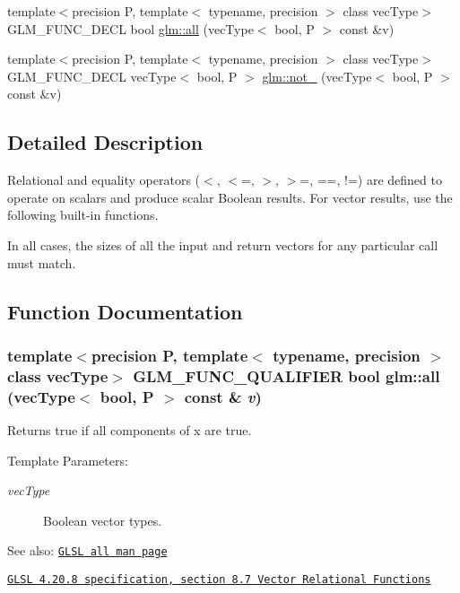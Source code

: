 \begin{CompactItemize}
\item 
{\footnotesize template$<$precision P, template$<$ typename, precision $>$ class vecType$>$ }\\GLM\_\-FUNC\_\-DECL bool \hyperlink{group__core__func__vector__relational_gabd60ec747e12c78e2d5c6e6c2ede230}{glm::all} (vecType$<$ bool, P $>$ const \&v)
\item 
{\footnotesize template$<$precision P, template$<$ typename, precision $>$ class vecType$>$ }\\GLM\_\-FUNC\_\-DECL vecType$<$ bool, P $>$ \hyperlink{group__core__func__vector__relational_g3f686b22d487d7d06447b15d3c621d2f}{glm::not\_\-} (vecType$<$ bool, P $>$ const \&v)
\end{CompactItemize}


\subsection{Detailed Description}
Relational and equality operators ($<$, $<$=, $>$, $>$=, ==, !=) are defined to operate on scalars and produce scalar Boolean results. For vector results, use the following built-in functions.

In all cases, the sizes of all the input and return vectors for any particular call must match. 

\subsection{Function Documentation}
\hypertarget{group__core__func__vector__relational_gabd60ec747e12c78e2d5c6e6c2ede230}{
\subsubsection[all]{\setlength{\rightskip}{0pt plus 5cm}template$<$precision P, template$<$ typename, precision $>$ class vecType$>$ GLM\_\-FUNC\_\-QUALIFIER bool glm::all (vecType$<$ bool, P $>$ const \& {\em v})}}
\label{group__core__func__vector__relational_gabd60ec747e12c78e2d5c6e6c2ede230}


Returns true if all components of x are true.

\begin{Desc}
\item[Template Parameters:]
\begin{description}
\item[{\em vecType}]Boolean vector types.\end{description}
\end{Desc}
\begin{Desc}
\item[See also:]\href{http://www.opengl.org/sdk/docs/manglsl/xhtml/all.xml}{\tt GLSL all man page} 

\href{http://www.opengl.org/registry/doc/GLSLangSpec.4.20.8.pdf}{\tt GLSL 4.20.8 specification, section 8.7 Vector Relational Functions} \end{Desc}


